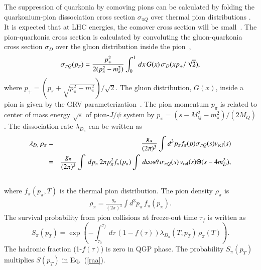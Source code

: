 {%
  The suppression of quarkonia by comoving pions can be calculated by folding the quarkonium-pion
dissociation cross section $\sigma_{\pi Q}$ over thermal pion distributions \cite{Vogt:1988fj}. 
It is expected  that at LHC energies, the comover cross section will be small~\cite{Lourenco:2008sk}.
{\color{black}
The pion-quarkonia cross section is calculated by convoluting the gluon-quarkonia cross section $\sigma_D$
over the gluon distribution inside the pion~\cite{Arleo:2001mp},
\begin{equation}
\sigma_{\pi Q} (p_{\pi}) = {p_+^2 \over 2(p_\pi^2 - m_\pi^2)} \int_0^1 \, dx \, G(x) \, \sigma_D(xp_+/\sqrt {2}),
\end{equation}
where $p_+ = (p_\pi + \sqrt{p_\pi^2-m_\pi^2})/\sqrt{2}$. The gluon distribution, $G(x)$, inside a pion is 
given by the GRV parameterization~\cite{Gluck:1991ey}. 
The pion momentum $p_\pi$ is related to center of mass energy $\sqrt{s}$ of pion-$J/\psi$ system by 
$p_\pi = (s-M_Q^2-m_\pi^2)/(2M_Q)$.}
The dissociation rate $\lambda_{D_{\pi}}$  can be written as
\begin{eqnarray}
  \lambda_{D_{\pi}} \, \rho_{\pi} & = & \frac{g_\pi}{(2\pi)^{3}} \int d^{3}p_{\pi} f_{\pi}(p) \sigma_{\pi Q} (s) v_{\rm rel} (s) \\ \nonumber
                              & = &\frac{g_\pi}{(2\pi)^{3}} \int\,dp_{\pi}\,2\pi p_{\pi}^{2} f_{\pi}(p_{\pi}) \int\,d{\rm cos}\theta\,\sigma_{\pi Q}(s) \, v_{\rm rel}(s) \Theta(s-4m_{D}^{2}),  \\\nonumber
\end{eqnarray}
where $f_{\pi}(p_{\pi},T)$ is the thermal pion distribution. The  pion density $\rho_{\pi}$ is 
\begin{eqnarray}
\rho_\pi =\frac{g_\pi}{(2\pi)^{3}} \int d^3p_{\pi} \, f_{\pi}(p_{\pi}). 
\end{eqnarray}
The survival probability from pion collisions at freeze-out time $\tau_f$ is written as
\begin{equation}
S_\pi(p_T) = \exp \left( {-\int_{\tau_0}^{\tau_f} \,d\tau\,(1-f(\tau)) \lambda_{D_{\pi}}(T,p_T)\,\rho_{\pi}(T)} \right).
\end{equation}
The hadronic fraction (1-$f(\tau)$) is zero in QGP phase.
The probability $S_\pi(p_T)$ multiplies $S(p_T)$ in Eq.~(\ref{raa}).




}
